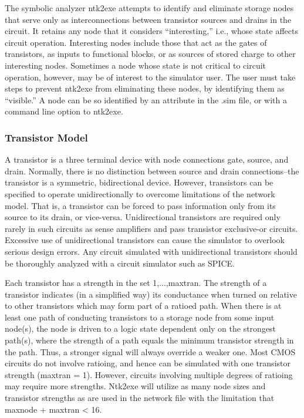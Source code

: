 The symbolic analyzer ntk2exe attempts to identify and eliminate storage
nodes that serve only as interconnections between transistor sources and
drains in the circuit.
It retains any node that it considers ``interesting,'' i.e., whose state
affects circuit operation.
Interesting nodes include those that act as the gates of transistors,
as inputs to functional blocks, or as sources of stored charge to other
interesting nodes.
Sometimes a node whose state is not critical to circuit operation,
however, may be of interest to the simulator user.
The user must take steps to prevent ntk2exe from
eliminating these nodes, by identifying them as ``visible.''
A node can be so identified by an attribute in the .sim file, or with
a command line option to ntk2exe.

\subsubsection{Transistor Model}

A transistor is a three terminal device with node connections gate,
source, and drain.
Normally, there is no distinction between source and drain connections--the
transistor is a symmetric, bidirectional device.
However, transistors can be specified to operate unidirectionally to overcome
limitations of the network model.
That is, a transistor can be forced to pass information only from its
source to its drain, or vice-versa.
Unidirectional transistors are required only rarely in such circuits as
sense amplifiers and pass transistor exclusive-or circuits.
Excessive use of unidirectional transistors can cause the simulator
to overlook serious design errors.
Any circuit simulated with unidirectional transistors
should be thoroughly analyzed with a circuit simulator such as SPICE.

Each transistor has a strength in the set {1,...,maxtran}.
The strength of a transistor indicates (in a simplified way) its
conductance when turned on relative to other transistors which may form
part of a ratioed path.
When there is at least one path of conducting transistors to a storage node
from some input node(s), the node is driven to a logic state
dependent only on the strongest path(s), where the strength of a path
equals the minimum transistor strength in the path.
Thus, a stronger signal will always override a weaker one.
Most CMOS circuits do not involve ratioing, and hence can be simulated with one
transistor strength (maxtran = 1).
However, circuits involving multiple degrees of ratioing may require more
strengths.
Ntk2exe will utilize as many node sizes and transistor strengths as are used
in the network file with the limitation that maxnode + maxtran < 16.

